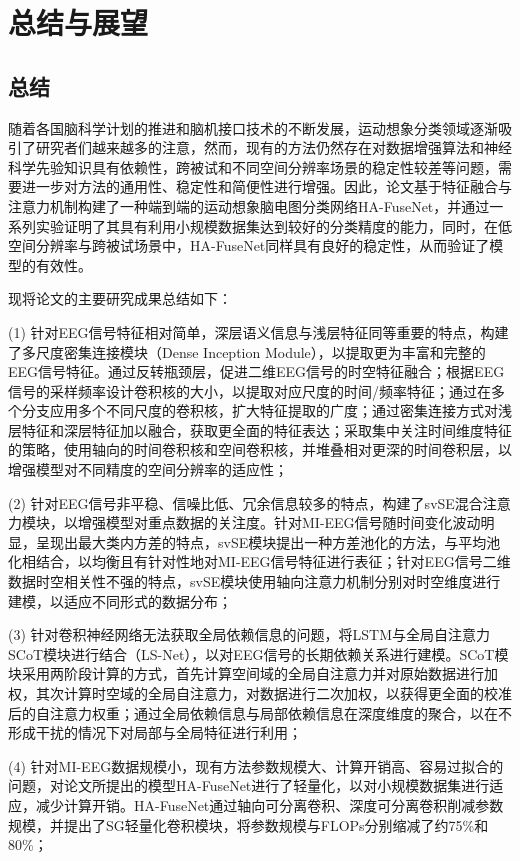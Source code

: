 
\chapter{总结与展望}

\section{总结}

随着各国脑科学计划的推进和脑机接口技术的不断发展，运动想象分类领域逐渐吸引了研究者们越来越多的注意，然而，现有的方法仍然存在对数据增强算法和神经科学先验知识具有依赖性，跨被试和不同空间分辨率场景的稳定性较差等问题，需要进一步对方法的通用性、稳定性和简便性进行增强。因此，论文基于特征融合与注意力机制构建了一种端到端的运动想象脑电图分类网络HA-FuseNet，并通过一系列实验证明了其具有利用小规模数据集达到较好的分类精度的能力，同时，在低空间分辨率与跨被试场景中，HA-FuseNet同样具有良好的稳定性，从而验证了模型的有效性。

现将论文的主要研究成果总结如下：

(1) 针对EEG信号特征相对简单，深层语义信息与浅层特征同等重要的特点，构建了多尺度密集连接模块（Dense Inception Module），以提取更为丰富和完整的EEG信号特征。通过反转瓶颈层，促进二维EEG信号的时空特征融合；根据EEG信号的采样频率设计卷积核的大小，以提取对应尺度的时间/频率特征；通过在多个分支应用多个不同尺度的卷积核，扩大特征提取的广度；通过密集连接方式对浅层特征和深层特征加以融合，获取更全面的特征表达；采取集中关注时间维度特征的策略，使用轴向的时间卷积核和空间卷积核，并堆叠相对更深的时间卷积层，以增强模型对不同精度的空间分辨率的适应性；

(2) 针对EEG信号非平稳、信噪比低、冗余信息较多的特点，构建了svSE混合注意力模块，以增强模型对重点数据的关注度。针对MI-EEG信号随时间变化波动明显，呈现出最大类内方差的特点\cite{mane2021fbcnet}，svSE模块提出一种方差池化的方法，与平均池化相结合，以均衡且有针对性地对MI-EEG信号特征进行表征；针对EEG信号二维数据时空相关性不强的特点，svSE模块使用轴向注意力机制分别对时空维度进行建模，以适应不同形式的数据分布；

(3) 针对卷积神经网络无法获取全局依赖信息的问题，将LSTM与全局自注意力SCoT模块进行结合（LS-Net），以对EEG信号的长期依赖关系进行建模。SCoT模块采用两阶段计算的方式，首先计算空间域的全局自注意力并对原始数据进行加权，其次计算时空域的全局自注意力，对数据进行二次加权，以获得更全面的校准后的自注意力权重；通过全局依赖信息与局部依赖信息在深度维度的聚合，以在不形成干扰的情况下对局部与全局特征进行利用；

(4) 针对MI-EEG数据规模小，现有方法参数规模大、计算开销高、容易过拟合的问题，对论文所提出的模型HA-FuseNet进行了轻量化，以对小规模数据集进行适应，减少计算开销。HA-FuseNet通过轴向可分离卷积、深度可分离卷积削减参数规模，并提出了SG轻量化卷积模块，将参数规模与FLOPs分别缩减了约75\%和80\%；


